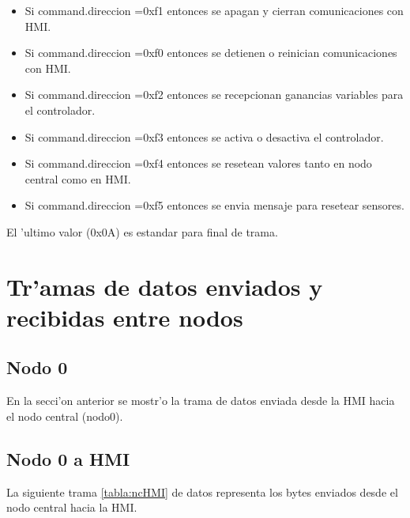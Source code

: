 	\begin{itemize}
		\item  Si command.direccion =0xf1 entonces se apagan y cierran comunicaciones con HMI.
		\item  Si command.direccion =0xf0 entonces se detienen o reinician comunicaciones con HMI.
		\item  Si command.direccion =0xf2 entonces se recepcionan ganancias variables para el controlador.
		\item  Si command.direccion =0xf3 entonces se activa o desactiva el controlador.
		\item  Si command.direccion =0xf4 entonces se resetean valores tanto en nodo central como en HMI.
		\item  Si command.direccion =0xf5 entonces se envia mensaje para resetear sensores.
		
		
	\end{itemize}
	
	El 'ultimo valor (0x0A) es estandar para final de trama.

\section{Tr'amas de datos enviados y recibidas entre nodos}

\subsection{Nodo 0}
En la secci'on anterior se mostr'o la trama de datos enviada desde la HMI hacia el nodo central (nodo0).

\subsection{Nodo 0 a HMI}
La siguiente trama \ref{tabla:ncHMI} de datos representa los bytes enviados desde el nodo central hacia la HMI.

